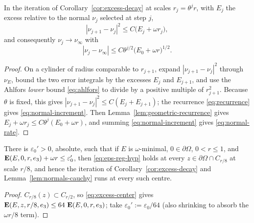 \begin{lemma}\label{lem:normals-cauchy}
In the iteration of Corollary~\ref{cor:excess-decay} at scales
$r_j=\theta^jr$, with $E_j$ the excess relative to the normal $\nu_j$ selected
at step $j$,
\begin{equation}\label{eq:normal-increment}
  |\nu_{j+1}-\nu_j|^2\le C\bigl(E_j+\omega r_j\bigr) ,
\end{equation}
and consequently $\nu_j\to\nu_\infty$ with
\begin{equation}\label{eq:normal-rate}
  |\nu_j-\nu_\infty|\le C\theta^{j/2}\bigl(E_0+\omega r\bigr)^{1/2}.
\end{equation}
\end{lemma}

\begin{proof}
On a cylinder of radius comparable to $r_{j+1}$, expand
$|\nu_{j+1}-\nu_j|^2$ through $\nu_E$, bound the two error integrals by the
excesses $E_j$ and $E_{j+1}$, and use the Ahlfors \emph{lower} bound
\eqref{eq:ahlfors} to divide by a positive multiple of $r_{j+1}^2$.
Because $\theta$ is fixed, this gives
$|\nu_{j+1}-\nu_j|^2\le C(E_j+E_{j+1})$; the recurrence
\eqref{eq:recurrence} gives \eqref{eq:normal-increment}.  Then
Lemma~\ref{lem:geometric-recurrence} gives
$E_j+\omega r_j\le C\theta^j(E_0+\omega r)$, and summing
\eqref{eq:normal-increment} gives \eqref{eq:normal-rate}.
\end{proof}

\begin{lemma}\label{lem:uniform-centers}
There is $\varepsilon_0'>0$, absolute, such that if $E$ is $\omega$-minimal,
$0\in\partial\Omega$, $0<r\le1$, and
$\operatorname{\mathbf E}(E,0,r,e_3)+\omega r\le\varepsilon_0'$, then
\eqref{eq:eps-reg-hyp} holds at every $z\in\partial\Omega\cap C_{r/8}$ at
scale $r/8$, and hence the iteration of
Corollary~\ref{cor:excess-decay} and Lemma~\ref{lem:normals-cauchy} runs at
every such centre.
\end{lemma}

\begin{proof}
$C_{r/8}(z)\subset C_{r/2}$, so \eqref{eq:excess-center} gives
$\operatorname{\mathbf E}(E,z,r/8,e_3)\le64\,\operatorname{\mathbf E}(E,0,r,e_3)$; take
$\varepsilon_0':=\varepsilon_0/64$ (also shrinking to absorb the $\omega r/8$
term).
\end{proof}

